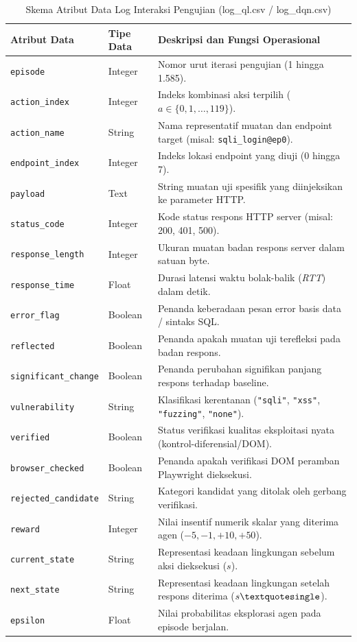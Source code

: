 \begin{table}[H]
\centering
\caption{Skema Atribut Data Log Interaksi Pengujian (log\_ql.csv / log\_dqn.csv)}
\label{tab:skema_log}
\begin{tabular}{|l|l|p{8.5cm}|}
\hline
\textbf{Atribut Data} & \textbf{Tipe Data} & \textbf{Deskripsi dan Fungsi Operasional} \\
\hline
\texttt{episode} & Integer & Nomor urut iterasi pengujian (1 hingga 1.585). \\
\texttt{action\_index} & Integer & Indeks kombinasi aksi terpilih ($a \in \{0, 1, \dots, 119\}$). \\
\texttt{action\_name} & String & Nama representatif muatan dan endpoint target (misal: \texttt{sqli\_login@ep0}). \\
\texttt{endpoint\_index} & Integer & Indeks lokasi endpoint yang diuji (0 hingga 7). \\
\texttt{payload} & Text & String muatan uji spesifik yang diinjeksikan ke parameter HTTP. \\
\texttt{status\_code} & Integer & Kode status respons HTTP server (misal: 200, 401, 500). \\
\texttt{response\_length} & Integer & Ukuran muatan badan respons server dalam satuan byte. \\
\texttt{response\_time} & Float & Durasi latensi waktu bolak-balik (\textit{RTT}) dalam detik. \\
\texttt{error\_flag} & Boolean & Penanda keberadaan pesan error basis data / sintaks SQL. \\
\texttt{reflected} & Boolean & Penanda apakah muatan uji terefleksi pada badan respons. \\
\texttt{significant\_change} & Boolean & Penanda perubahan signifikan panjang respons terhadap baseline. \\
\texttt{vulnerability} & String & Klasifikasi kerentanan (\texttt{"sqli"}, \texttt{"xss"}, \texttt{"fuzzing"}, \texttt{"none"}). \\
\texttt{verified} & Boolean & Status verifikasi kualitas eksploitasi nyata (kontrol-diferensial/DOM). \\
\texttt{browser\_checked} & Boolean & Penanda apakah verifikasi DOM peramban Playwright dieksekusi. \\
\texttt{rejected\_candidate} & String & Kategori kandidat yang ditolak oleh gerbang verifikasi. \\
\texttt{reward} & Integer & Nilai insentif numerik skalar yang diterima agen ($-5, -1, +10, +50$). \\
\texttt{current\_state} & String & Representasi keadaan lingkungan sebelum aksi dieksekusi ($s$). \\
\texttt{next\_state} & String & Representasi keadaan lingkungan setelah respons diterima ($s\textquotesingle$). \\
\texttt{epsilon} & Float & Nilai probabilitas eksplorasi agen pada episode berjalan. \\
\hline
\end{tabular}
\end{table}

